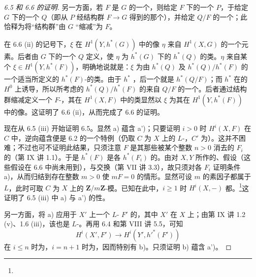 \begin{proof}[6.5 和 6.6 的证明]
另一方面，若 $F$ 是 $G$ 的一个，则给定 $F$ 下的一个 $P$，于给定 $G$ 下的一个 $Q$（即从 $P$ 经结构群 $F\to G$ 得到的那个），并给定 $Q/F$ 的一个；此恰释为将“结构群”由 $G$ “缩减”为 $F$。

在 6.6 (ii) 的记号下，$\xi$ 在 $H^1(Y,h^*(G))$ 中的像 $\eta$ 来自 $H^1(X,G)$ 的一个元素。后者由 $G$ 下的一个 $Q$ 定义，使 $\eta$ 为 $h^*(G)$ 下的 $h^*(Q)$ 的类。$\eta$ 来自某个 $\xi\in H^1(Y,h^*(F))$，明确地说就是：$\xi$ 为由 $h^*(Q)$ 及 $h^*(Q)/h^*(F)$ 的一个适当所定义的 $h^*(F)$-的类。由于 $h^*$ ，后一个就是 $h^*(Q/F)$；而 $h^*$ 在的 $H^0$ 上诱导，所以所考虑的 $h^*(Q)/h^*(F)$ 的来自 $Q/F$ 的一个。后者通过结构群缩减定义一个 $F$-，其在 $H^1(X,F)$ 中的类显然以 $\xi$ 为其在 $H^1(Y,h^*(F))$ 中的像。这证明了 6.6 (ii)，从而完成了 6.6 的证明。

现在从 6.5 (iii) 开始证明 6.5。显然 a) 蕴含 a')；只要证明 $i>0$ 时 $H^i(X,F)$ 在 $C$ 中，逆向蕴含便是 6.2 的一个特例（仍取 $C$ 为 $X$ 上的 $L$-，$C'$ 为）。这并不困难；不过也可不证明此结果，只须注意
$F$ 是其那些被某个整数 $n>0$ 消去的 $F_i$ 的（第 IX 讲 1.1）。于是 $h^*(F)$ 是各 $h^*(F_i)$ 的。由对 $X,Y$ 所作的、假设（这些假设在 6.6 中尚未用到），与交换（第 VII 讲 3.3），故只须对各 $F_i$ 证明条件 a)，从而归结到存在整数 $m>0$ 使 $mF=0$ 的情形。显然可设 $m$ 的素因子都属于 $L$，此时可取 $C$ 为 $X$ 上的 $\mathbf Z/m\mathbf Z$-模。已知在此中，$i\geq1$ 时 $H^i(X,-)$ 都。\footnote{}这证明了 6.5 (iii) 中 a) 与 a') 的性。

另一方面，将 a) 应用于 $X'$ 上一个 $L$- $F'$ 的，其中 $X'$ 在 $X$ 上；由第 IX 讲 1.2 (v)、1.6 (iii)，该也是 $L$-。再用 6.4 和第 VIII 讲 5.5，可知
\[
H^i(X',F')\longrightarrow H^i(Y',h'^*(F'))
\]
在 $i\leq n$ 时为，$i=n+1$ 时为，因而特别有 b)。只须证明 b) 蕴含 a')。


\end{proof}
